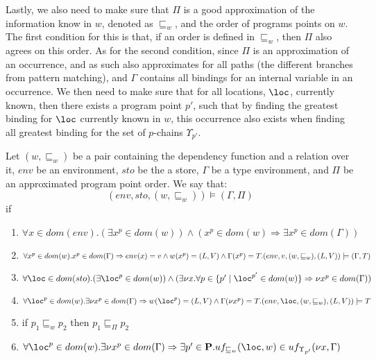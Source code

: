 \documentclass[../../master.tex]{subfiles}
\begin{document}
Lastly, we also need to make sure that $\Pi$ is a good approximation of the information know in $w$, denoted as $\sqsubseteq_w$, and the order of programs points on $w$.
The first condition for this is that, if an order is defined in $\sqsubseteq_w$, then $\Pi$ also agrees on this order.
As for the second condition, since $\Pi$ is an approximation of an occurrence, and as such also approximates for all paths (the different branches from pattern matching), and $\Gamma$ contains all bindings for an internal variable in an occurrence.
We then need to make sure that for all locations, $\loc$, currently known, then there exists a program point $p'$, such that by finding the greatest binding for $\loc$ currently known in $w$, 
this occurrence also exists when finding all greatest binding for the set of $p$-chains $\Upsilon_{p'}$.

\begin{definition}\label{def:EnvAgree}
	Let $(w,\sqsubseteq_w)$ be a pair containing the dependency function and a relation over it, $env$ be an environment, $sto$ be the a store, $\Gamma$ be a type environment, and $\Pi$ be an approximated program point order.
	We say that:
	$$(env,sto,(w,\sqsubseteq_w))\models(\Gamma,\Pi)$$
	if 
	\begin{enumerate}
		\item $\forall x\in dom(env).(\exists x^p\in dom(w))\wedge(x^p\in dom(w)\Rightarrow \exists x^p\in dom(\Gamma))$
		\item $\forall x^p\in dom(w).x^p\in dom(\Gamma)\Rightarrow env(x)=v\wedge w(x^p)=(L,V)\wedge\Gamma(x^p)=T.\\(env,v,(w,\sqsubseteq_w),(L,V))\models (\Gamma,T)$
		\item $\forall \loc\in dom(sto).(\exists \loc^p\in dom(w))\wedge(\exists \nu x.\forall p\in\{p'\mid\loc^{p'}\in dom(w)\}\Rightarrow\nu x^p\in dom(\Gamma))$
		\item $\forall \loc^p \in dom(w).\exists\nu x^{p}\in dom(\Gamma)\Rightarrow w(\loc^p)=(L,V)\wedge\Gamma(\nu x^{p})=T.(env,\loc,(w,\sqsubseteq_w),(L,V))\models T$
		\item if $p_1\sqsubseteq_w p_2$ then $p_1\sqsubseteq_\Pi p_2$
	\item $\forall \loc^p\in dom(w).\exists \nu x^p\in dom(\Gamma)\Rightarrow\exists p'\in\cat{P}.uf_{\sqsubseteq_w}(\loc,w)\in uf_{\Upsilon_{p'}}(\nu x,\Gamma)$
	\end{enumerate}
\end{definition}
\end{document}
